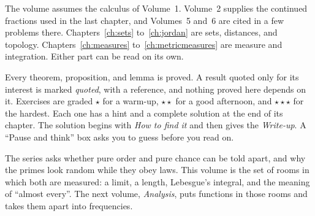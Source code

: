 The volume assumes the calculus of Volume~1. Volume~2 supplies the continued fractions used in the last chapter, and Volumes~5 and~6 are cited in a few problems there. Chapters~\ref{ch:sets} to~\ref{ch:jordan} are sets, distances, and topology. Chapters~\ref{ch:measures} to~\ref{ch:metricmeasures} are measure and integration. Either part can be read on its own.

Every theorem, proposition, and lemma is proved. A result quoted only for its interest is marked \emph{quoted}, with a reference, and nothing proved here depends on it. Exercises are graded \textbf{$\star$} for a warm-up, \textbf{$\star\star$} for a good afternoon, and \textbf{$\star\star\star$} for the hardest. Each one has a hint and a complete solution at the end of its chapter. The solution begins with \emph{How to find it} and then gives the \emph{Write-up}. A ``Pause and think'' box asks you to guess before you read on.

The series asks whether pure order and pure chance can be told apart, and why the primes look random while they obey laws. This volume is the set of rooms in which both are measured: a limit, a length, Lebesgue's integral, and the meaning of ``almost every''. The next volume, \emph{Analysis}, puts functions in those rooms and takes them apart into frequencies.

